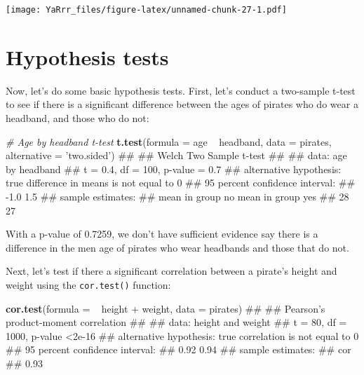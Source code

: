 \documentclass[]{book}
\newenvironment{Shaded}{\begin{snugshade}}{\end{snugshade}}
\newcommand{\KeywordTok}[1]{\textcolor[rgb]{0.13,0.29,0.53}{\textbf{{#1}}}}
\newcommand{\DataTypeTok}[1]{\textcolor[rgb]{0.13,0.29,0.53}{{#1}}}
\newcommand{\StringTok}[1]{\textcolor[rgb]{0.31,0.60,0.02}{{#1}}}
\newcommand{\CommentTok}[1]{\textcolor[rgb]{0.56,0.35,0.01}{\textit{{#1}}}}
\newcommand{\NormalTok}[1]{{#1}}
\theoremstyle{definition}
\theoremstyle{definition}
\theoremstyle{remark}
\begin{document}
\texttt{[image: YaRrr\_files/figure-latex/unnamed-chunk-27-1.pdf]}

\section{Hypothesis tests}\label{hypothesis-tests}

Now, let's do some basic hypothesis tests. First, let's conduct a
two-sample t-test to see if there is a significant difference between
the ages of pirates who do wear a headband, and those who do not:

\begin{Shaded}
\begin{Highlighting}[]
\CommentTok{# Age by headband t-test}
\KeywordTok{t.test}\NormalTok{(}\DataTypeTok{formula =} \NormalTok{age ~}\StringTok{ }\NormalTok{headband,}
       \DataTypeTok{data =} \NormalTok{pirates,}
       \DataTypeTok{alternative =} \StringTok{'two.sided'}\NormalTok{)}
\NormalTok{## }
\NormalTok{##  Welch Two Sample t-test}
\NormalTok{## }
\NormalTok{## data:  age by headband}
\NormalTok{## t = 0.4, df = 100, p-value = 0.7}
\NormalTok{## alternative hypothesis: true difference in means is not equal to 0}
\NormalTok{## 95 percent confidence interval:}
\NormalTok{##  -1.0  1.5}
\NormalTok{## sample estimates:}
\NormalTok{##  mean in group no mean in group yes }
\NormalTok{##                28                27}
\end{Highlighting}
\end{Shaded}

With a p-value of 0.7259, we don't have sufficient evidence say there is
a difference in the men age of pirates who wear headbands and those that
do not.

Next, let's test if there a significant correlation between a pirate's
height and weight using the \texttt{cor.test()} function:

\begin{Shaded}
\begin{Highlighting}[]
\KeywordTok{cor.test}\NormalTok{(}\DataTypeTok{formula =} \NormalTok{~}\StringTok{ }\NormalTok{height +}\StringTok{ }\NormalTok{weight,}
         \DataTypeTok{data =} \NormalTok{pirates)}
\NormalTok{## }
\NormalTok{##  Pearson's product-moment correlation}
\NormalTok{## }
\NormalTok{## data:  height and weight}
\NormalTok{## t = 80, df = 1000, p-value <2e-16}
\NormalTok{## alternative hypothesis: true correlation is not equal to 0}
\NormalTok{## 95 percent confidence interval:}
\NormalTok{##  0.92 0.94}
\NormalTok{## sample estimates:}
\NormalTok{##  cor }
\NormalTok{## 0.93}
\end{Highlighting}
\end{Shaded}
\end{document}
